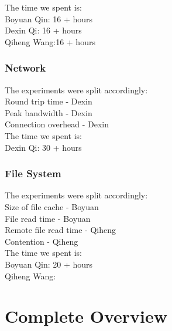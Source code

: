 \documentclass{article} %
\begin{document}
The time we spent is:\\
Boyuan Qin: 16 + hours\\
Dexin Qi: 16 + hours\\
Qiheng Wang:16 + hours

\subsubsection{Network}
The experiments were split accordingly:\\
Round trip time - Dexin\\
Peak bandwidth - Dexin\\
Connection overhead - Dexin\\

The time we spent is:\\
Dexin Qi: 30 + hours\\
\subsubsection{File System}
The experiments were split accordingly:\\
Size of file cache - Boyuan\\
File read time - Boyuan\\
Remote file read time - Qiheng \\
Contention - Qiheng\\

The time we spent is:\\
Boyuan Qin: 20 + hours\\
Qiheng Wang:

\section{Complete Overview}
\end{document}
